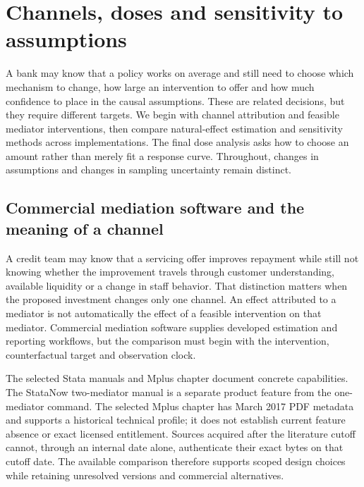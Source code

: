 \chapter{Channels, doses and sensitivity to assumptions}




A bank may know that a policy works on average and still need to choose
which mechanism to change, how large an intervention to offer and how much
confidence to place in the causal assumptions. These are related decisions,
but they require different targets. We begin with channel attribution and
feasible mediator interventions, then compare natural-effect estimation and
sensitivity methods across implementations. The final dose analysis asks how
to choose an amount rather than merely fit a response curve. Throughout,
changes in assumptions and changes in sampling uncertainty remain distinct.

\section{Commercial mediation software and the meaning of a channel}
\label{exec20:med-scope}
A credit team may know that a servicing offer improves repayment while still not knowing whether the improvement travels through customer understanding, available liquidity or a change in staff behavior. That distinction matters when the proposed investment changes only one channel. An effect attributed to a mediator is not automatically the effect of a feasible intervention on that mediator. Commercial mediation software supplies developed estimation and reporting workflows, but the comparison must begin with the intervention, counterfactual target and observation clock.

The selected Stata manuals and Mplus chapter document concrete capabilities. The StataNow two-mediator manual is a separate product feature from the one-mediator command. The selected Mplus chapter has March 2017 PDF metadata and supports a historical technical profile; it does not establish current feature absence or exact licensed entitlement. Sources acquired after the literature cutoff cannot, through an internal date alone, authenticate their exact bytes on that cutoff date. The available comparison therefore supports scoped design choices while retaining unresolved versions and commercial alternatives.~\citep{exec20_med_stata_one,exec20_med_stata_multiple,exec20_med_mplus_ch17}

